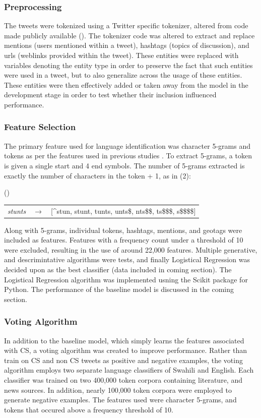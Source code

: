 \documentclass[12pt]{article}\usepackage[]{graphicx}\usepackage[]{color}
\newcommand{\eq}[1]{\bigskip\par
\stepcounter{equation}
\noindent\parbox{.5in}{(\theequation)}
\begin{minipage}[t]{4.5in}
#1
\end{minipage}
\par\bigskip}
\begin{document}
\subsubsection{Preprocessing}

The tweets were tokenized using a Twitter specific tokenizer, altered  from code made publicly available (). The tokenizer code was altered to extract and replace mentions (users mentioned within a tweet), hashtags (topics of discussion), and urls (weblinks provided within the tweet). These entities were replaced with variables denoting the entity type in order to preserve the fact that such entities were used in a tweet, but to also generalize across the usage of these entities. These entities were then effectively added or taken away from the model in the development stage in order to test whether their inclusion influenced performance.

\subsubsection{Feature Selection}

The primary feature used for language identification was character 5-grams and tokens as per the features used in previous studies \cite{tan14}. To extract 5-grams, a token is given a single start and 4 end symbols. The number of 5-grams extracted is exactly the number of characters in the token + 1, as in (2):

\eq{
\begin{tabular}[t]{lll}
  \textit{stunts} & $\rightarrow$ & [\^{}stun, stunt, tunts, unts\$, nts\$\$, ts\$\$\$, s\$\$\$\$] \\
\end{tabular}
}

Along with 5-grams, individual tokens, hashtags, mentions, and geotags were included as features. Features with a frequency count under a threshold of 10 were excluded, resulting in the use of around 22,000 features. Multiple generative, and descrimintative algorithms were tests, and finally Logistical Regression was decided upon as the best classifier (data included in coming section). The Logistical Regression algorithm was implemented usning the Scikit package for Python. The performance of the baseline model is discussed in the coming section.

\subsubsection{Voting Algorithm}
In addition to the baseline model, which simply learns the features associated with CS, a voting algorithm was created to improve performance. Rather than train on CS and non CS tweets as positive and negative examples, the voting algorithm employs two separate language classifiers of Swahili and English. Each classifier was trained on two 400,000 token corpora containing literature, and news sources. In addition, nearly 100,000 token corpora were employed to generate negative examples. The features used were character 5-grams, and tokens that occured above a frequency threshold of 10.
\end{document}
